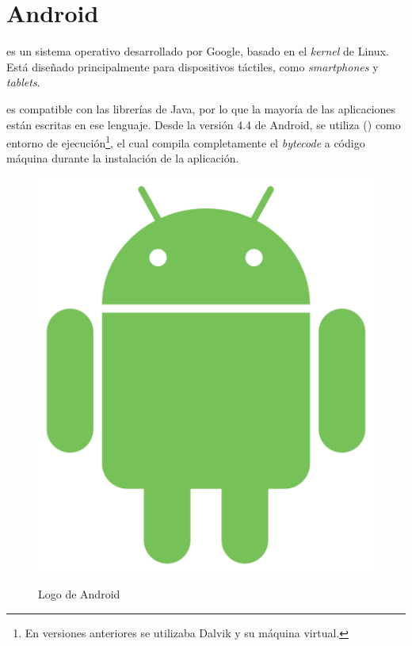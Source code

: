 
 \section{Android}

  es un sistema operativo desarrollado por Google, basado en el \emph{kernel} de Linux.
 Está diseñado principalmente para dispositivos táctiles, como \emph{smartphones} y \emph{tablets}.

  es compatible con las librerías de Java, por lo que la mayoría de las aplicaciones están escritas en ese lenguaje.
 Desde la versión 4.4 de Android, se utiliza  () como entorno de ejecución\footnote{En versiones anteriores se utilizaba Dalvik y su máquina virtual.},
 el cual compila completamente el \emph{bytecode} a código máquina durante la instalación de la aplicación. \emph{\parencite{Reference7}}

 \begin{figure}[ht]
   \centering
   \includegraphics[scale=0.1]{Figures/AndroidLogo}
   \decoRule
   \caption[Android (Logo)]{Logo de Android} \emph{\parencite{Reference3}}
   \label{fig:AndroidLogo}
 \end{figure}

